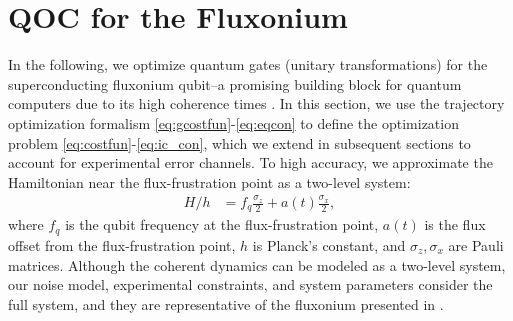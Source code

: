 \section{QOC for the Fluxonium \label{sec:fluxonium}}
In the following, we optimize quantum gates
(unitary transformations) for the superconducting fluxonium qubit--a promising
building block for quantum computers due to its high
coherence times
\cite{earnest2018realization, lin2018demonstration,
  manucharyan2009fluxonium, nguyen2019high,
  zhang2020universal}.
In this section, we use the trajectory optimization
formalism \eqref{eq:gcostfun}-\eqref{eq:eqcon}
to define the optimization problem \eqref{eq:costfun}-\eqref{eq:ic_con},
which we extend in subsequent sections to account
for experimental error channels.
To high accuracy, we approximate the Hamiltonian near the flux-frustration
point as a two-level system:
\begin{align}
  H/h &= f_{q} \frac{\sigma_{z}}{2} + a(t) \frac{\sigma_{x}}{2},
  \label{eq:hamiltonian}
\end{align}
where $f_{q}$ is the qubit frequency at the flux-frustration point,
$a(t)$ is the flux offset from the flux-frustration point,
$h$ is Planck's constant, and $\sigma_{z}, \sigma_{x}$
are Pauli matrices. Although the coherent dynamics can be modeled as a two-level
system, our noise model, experimental constraints, and system parameters
consider the full system, and they are representative of the fluxonium
presented in \cite{zhang2020universal}.

